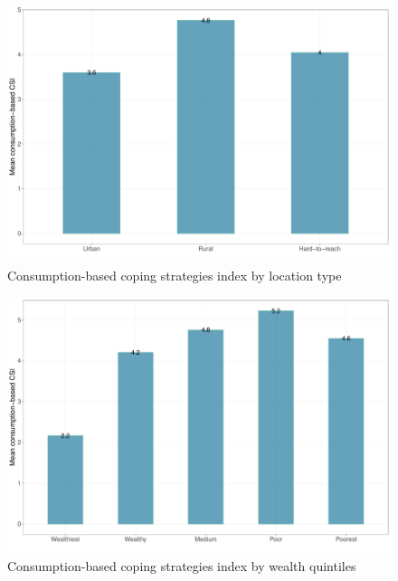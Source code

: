 \documentclass[12pt,a4paper]{article}
\begin{document}
\newpage

\begin{figure}[H]

{\centering \includegraphics{kayinReport_files/figure-latex/ccsi1plot-1} 

}

\caption{Consumption-based coping strategies index by location type}\label{fig:ccsi1plot}
\end{figure}

\begin{figure}[H]

{\centering \includegraphics{kayinReport_files/figure-latex/ccsi2plot-1} 

}

\caption{Consumption-based coping strategies index by wealth quintiles}\label{fig:ccsi2plot}
\end{figure}
\end{document}
